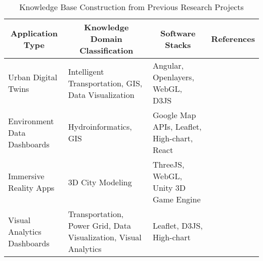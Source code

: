 \begin{scriptsize}
\begin{table*}[h]
\footnotesize
\centering
\caption{Knowledge Base Construction from Previous Research Projects} \label{tab:KG_previousProjects} 
\begin{tabular*}{\textwidth}{|p{3.2 cm}|p{3cm}|p{3cm}|p{4.5cm}|}
 \hline
\multicolumn{1}{c}{\textbf{Application Type}}  
& \multicolumn{1}{c}{\textbf{Knowledge Domain Classification}} 
& \multicolumn{1}{c}{\textbf{Software Stacks}} 
& \multicolumn{1}{c}{\textbf{References}}  \\
\hline
 Urban Digital Twins & Intelligent Transportation, GIS, Data Visualization  & Angular, Openlayers, WebGL, D3JS & \citet{li2024empowering, xu2021continuous, xu2023smart, niloofar2023general} \\ 
 \hline
 Environment Data Dashboards & Hydroinformatics, GIS & Google Map APIs, Leaflet, High-chart, React & \citet{xu2019web2, xu2022overview, xu2020web, xu2019web} \\
 \hline
 Immersive Reality Apps & 3D City Modeling & ThreeJS, WebGL, Unity 3D Game Engine & \citet{xu2023toward, xu2024semi} \\
 \hline
 Visual Analytics Dashboards & Transportation, Power Grid, Data Visualization, Visual Analytics & Leaflet, D3JS, High-chart & \citet{chinthavali2022alternative, berres2021explorative, berres2021multiscale, xu2022interactive, xu2022geo, xu2021visualizing, shao2022computer, xu2024explainable, muste2017community}  \\
 \hline
\end{tabular*}
\end{table*}
\end{scriptsize}


 
			 